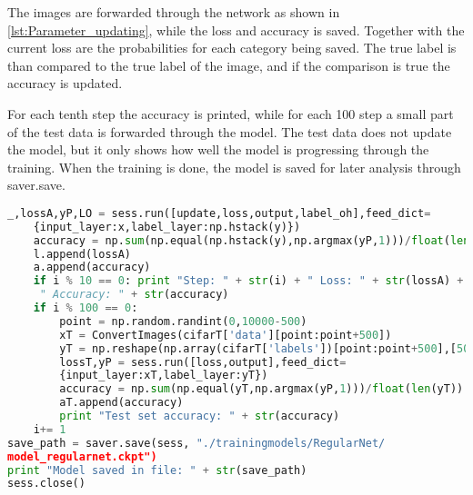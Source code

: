The images are forwarded through the network as shown in \ref{lst:Parameter_updating}, while the loss and accuracy is saved. Together with the current loss are the probabilities for each category being saved. The true label is than compared to the true label of the image, and if the comparison is true the accuracy is updated.

For each tenth step the accuracy is printed, while for each 100 step a small part of the test data is forwarded through the model. The test data does not update the model, but it only shows how well the model is progressing through the training. When the training is done, the model is saved for later analysis through saver.save.

\begin{lstlisting}[language=Python, label=lst:Parameter_updating, caption=Parameter updating: loss and accuracy are saved and they are tested every 100 steps]
	_,lossA,yP,LO = sess.run([update,loss,output,label_oh],feed_dict=
	{input_layer:x,label_layer:np.hstack(y)})
	accuracy = np.sum(np.equal(np.hstack(y),np.argmax(yP,1)))/float(len(y))
	l.append(lossA)
	a.append(accuracy)
	if i % 10 == 0: print "Step: " + str(i) + " Loss: " + str(lossA) +
	 " Accuracy: " + str(accuracy)
	if i % 100 == 0: 
		point = np.random.randint(0,10000-500)
		xT = ConvertImages(cifarT['data'][point:point+500]) 
		yT = np.reshape(np.array(cifarT['labels'])[point:point+500],[500])
		lossT,yP = sess.run([loss,output],feed_dict=
		{input_layer:xT,label_layer:yT})
		accuracy = np.sum(np.equal(yT,np.argmax(yP,1)))/float(len(yT))
		aT.append(accuracy)
		print "Test set accuracy: " + str(accuracy)
	i+= 1
save_path = saver.save(sess, "./trainingmodels/RegularNet/
model_regularnet.ckpt")
print "Model saved in file: " + str(save_path)
sess.close()
\end{lstlisting}



